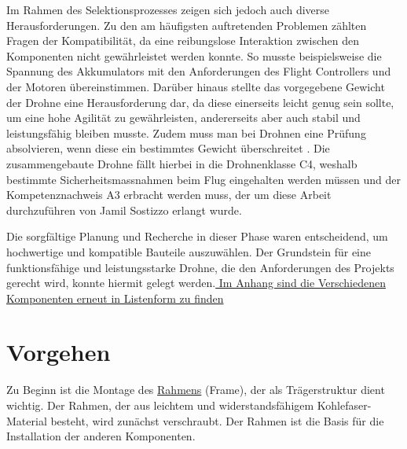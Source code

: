 Im Rahmen des Selektionsprozesses zeigen sich jedoch auch diverse Herausforderungen. Zu den am häufigsten auftretenden Problemen zählten Fragen der Kompatibilität, da eine reibungslose Interaktion zwischen den Komponenten nicht gewährleistet werden konnte. So musste beispielsweise die Spannung des Akkumulators mit den Anforderungen des Flight Controllers und der Motoren übereinstimmen. Darüber hinaus stellte das vorgegebene Gewicht der Drohne eine Herausforderung dar, da diese einerseits leicht genug sein sollte, um eine hohe Agilität zu gewährleisten, andererseits aber auch stabil und leistungsfähig bleiben musste. Zudem muss man bei Drohnen eine Prüfung absolvieren, wenn diese ein bestimmtes Gewicht überschreitet \cite{Prüfung}. Die zusammengebaute Drohne fällt hierbei in die Drohnenklasse C4, weshalb bestimmte Sicherheitsmassnahmen beim Flug eingehalten werden müssen und der Kompetenznachweis A3 erbracht werden muss, der um diese Arbeit durchzuführen von Jamil Sostizzo erlangt wurde.
 
Die sorgfältige Planung und Recherche in dieser Phase waren entscheidend, um hochwertige und kompatible Bauteile auszuwählen. Der Grundstein für eine funktionsfähige und leistungsstarke Drohne, die den Anforderungen des Projekts gerecht wird, konnte hiermit gelegt werden.\hyperref[infoteile]{ Im Anhang sind die Verschiedenen Komponenten erneut in Listenform zu finden}

\section{Vorgehen}

 Zu Beginn ist die Montage des \hyperref[sec:Frame]{Rahmens} (Frame), der als Trägerstruktur dient wichtig. Der Rahmen, der aus leichtem und widerstandsfähigem Kohlefaser-Material besteht, wird zunächst verschraubt. Der Rahmen ist die Basis für die Installation der anderen Komponenten.

